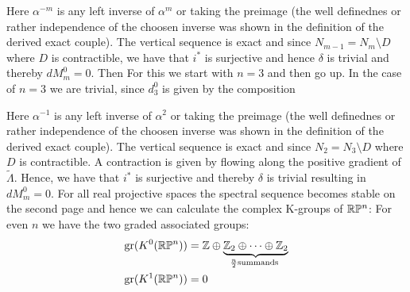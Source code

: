 \begin{example}
	 \begin{center}
	 \end{center}
	 Here $\alpha^{-m}$ is any left inverse of $\alpha^m$ or taking the preimage (the well definednes or rather independence of the choosen inverse was shown in the definition of the derived exact couple). The vertical sequence is exact and since $N_{m-1}=N_m\setminus D$ where $D$ is contractible, we have that $i^*$ is surjective and hence $\delta$ is trivial and thereby $dM_m^0=0$.
	  Then For this we start with $n=3$ and then go up. In the case of $n=3$ we are trivial, since $d^0_3$ is given by the composition
	\begin{center}
	\end{center}

			Here $\alpha^{-1}$ is any left inverse of $\alpha^2$ or taking the preimage (the well definednes or rather independence of the choosen inverse was shown in the definition of the derived exact couple). The vertical sequence is exact and since $N_2=N_3\setminus D$ where $D$ is contractible. A contraction is given by flowing along the positive gradient of $\tilde{\Lambda}$. Hence, we have that $i^*$ is surjective and thereby $\delta$ is trivial resulting in $dM_m^0=0$. For all real projective spaces the spectral sequence becomes stable on the second page and hence we can calculate the complex K-groups of $\mathbb{R}\mathbb{P}^n$: 
			For even $n$ we have the two graded associated groups:
			\begin{align*}
				\operatorname{\mathrm{gr}}(K^0(\mathbb{R}\mathbb{P}^n))&=\mathbb{Z}\oplus \underbrace{\mathbb{Z}_2 \oplus \cdots \oplus \mathbb{Z}_2}_{\frac{n}{2} \text{summands }} \\
				\operatorname{\mathrm{gr}}(K^1(\mathbb{R}\mathbb{P}^n))&=0
			\end{align*}
			
			
			

\end{example}
